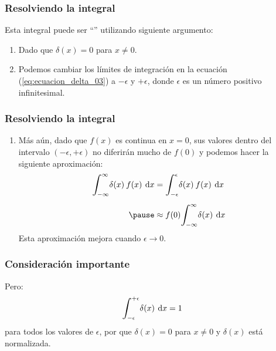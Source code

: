 \documentclass[12pt]{beamer}
\begin{document}
\begin{frame}
\frametitle{Resolviendo la integral}
Esta integral puede ser \enquote{} utilizando siguiente argumento: \pause
{}
\begin{enumerate}[<+->]
\item Dado que $\delta (x) = 0$ para $x \neq 0$.
\item Podemos cambiar los límites de integración en la ecuación (\ref{eq:ecuacion_delta_03}) a $- \epsilon$ y $+ \epsilon$, donde $\epsilon$ es un número positivo infinitesimal.
\seti
\end{enumerate}
\end{frame}

\begin{frame}
\frametitle{Resolviendo la integral}
\begin{enumerate}[<+->]
\conti
\item Más aún, dado que $f (x)$ es continua en $x = 0$, sus valores dentro del intervalo $( - \epsilon, + \epsilon)$ no diferirán mucho de $f (0)$ y podemos hacer la siguiente aproximación:
\begin{eqnarray*}
\begin{aligned}
\scaleint{6ex}_{\bs -\infty}^{\infty} \delta (x) \: f (x) \: \dd{x} &= \scaleint{6ex}_{\bs -\epsilon}^{\epsilon} \delta (x) \: f (x) \: \dd{x} \\[0.5em] \pause
&\approx f (0) \scaleint{6ex}_{\bs -\infty}^{\infty} \delta (x) \: \dd{x}
\end{aligned}
\end{eqnarray*}
Esta aproximación mejora cuando $\epsilon \to 0$.
\end{enumerate}
\end{frame}

\begin{frame}
\frametitle{Consideración importante}
Pero:
\pause
\begin{align*}
\scaleint{6ex}_{\bs -\epsilon}^{+\epsilon} \delta (x) \: \dd{x} = 1
\end{align*}
para todos los valores de $\epsilon$, por que $\delta (x) = 0$ para $x \neq 0$ y $\delta (x)$ está normalizada.
\end{frame}
\end{document}
